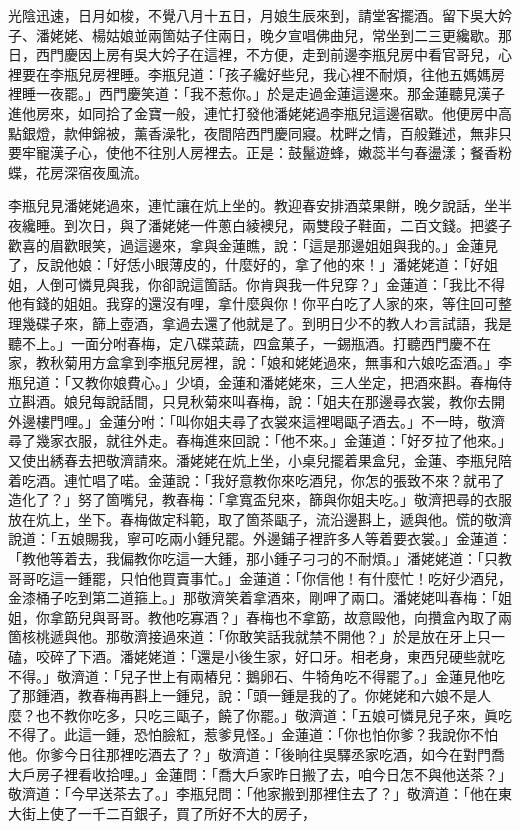 光陰迅速，日月如梭，不覺八月十五日，月娘生辰來到，請堂客擺酒。留下吳大妗子、潘姥姥、楊姑娘並兩箇姑子住兩日，晚夕宣唱佛曲兒，常坐到二三更纔歇。那日，西門慶因上房有吳大妗子在這裡，不方便，走到前邊李瓶兒房中看官哥兒，心裡要在李瓶兒房裡睡。李瓶兒道：「孩子纔好些兒，我心裡不耐煩，往他五媽媽房裡睡一夜罷。」{}西門慶笑道：「我不惹你。」於是走過金蓮這邊來。那金蓮聽見漢子進他房來，如同拾了金寶一般，連忙打發他潘姥姥過李瓶兒這邊宿歇。他便房中高點銀燈，款伸錦被，薰香澡牝，夜間陪西門慶同寢。枕畔之情，百般難述，無非只要牢寵漢子心，使他不往別人房裡去。正是：鼓鬣遊蜂，嫩蕊半勻春盪漾；餐香粉蝶，花房深宿夜風流。

李瓶兒見潘姥姥過來，連忙讓在炕上坐的。教迎春安排酒菜果餅，晚夕說話，坐半夜纔睡。到次日，與了潘姥姥一件蔥白綾襖兒，兩雙段子鞋面，二百文錢。把婆子歡喜的眉歡眼笑，過這邊來，拿與金蓮瞧，說：「這是那邊姐姐與我的。」金蓮見了，反說他娘：「好恁小眼薄皮的，什麼好的，拿了他的來！」潘姥姥道：「好姐姐，人倒可憐見與我，你卻說這箇話。你肯與我一件兒穿？」金蓮道：「我比不得他有錢的姐姐。我穿的還沒有哩，拿什麼與你！你平白吃了人家的來，等住回可整理幾碟子來，篩上壺酒，拿過去還了他就是了。到明日少不的教人わ言試語，我是聽不上。」{}一面分咐春梅，定八碟菜蔬，四盒菓子，一錫瓶酒。打聽西門慶不在家，教秋菊用方盒拿到李瓶兒房裡，說：「娘和姥姥過來，無事和六娘吃盃酒。」李瓶兒道：「又教你娘費心。」少頃，金蓮和潘姥姥來，三人坐定，把酒來斟。春梅侍立斟酒。娘兒每說話間，只見秋菊來叫春梅，說：「姐夫在那邊尋衣裳，教你去開外邊樓門哩。」金蓮分咐：「叫你姐夫尋了衣裳來這裡喝甌子酒去。」不一時，敬濟尋了幾家衣服，就往外走。春梅進來回說：「他不來。」金蓮道：「好歹拉了他來。」又使出綉春去把敬濟請來。潘姥姥在炕上坐，小桌兒擺着果盒兒，金蓮、李瓶兒陪着吃酒。連忙唱了喏。金蓮說：「我好意教你來吃酒兒，你怎的張致不來？就弔了造化了？」努了箇嘴兒，教春梅：「拿寬盃兒來，篩與你姐夫吃。」敬濟把尋的衣服放在炕上，坐下。春梅做定科範，取了箇茶甌子，流沿邊斟上，遞與他。慌的敬濟說道：「五娘賜我，寧可吃兩小鍾兒罷。外邊鋪子裡許多人等着要衣裳。」金蓮道：「教他等着去，我偏教你吃這一大鍾，那小鍾子刁刁的不耐煩。」潘姥姥道：「只教哥哥吃這一鍾罷，只怕他買賣事忙。」金蓮道：「你信他！有什麼忙！吃好少酒兒，金漆桶子吃到第二道箍上。」那敬濟笑着拿酒來，剛呷了兩口。潘姥姥叫春梅：「姐姐，你拿筯兒與哥哥。教他吃寡酒？」春梅也不拿筯，故意毆他，向攢盒內取了兩箇核桃遞與他。{}那敬濟接過來道：「你敢笑話我就禁不開他？」於是放在牙上只一磕，咬碎了下酒。潘姥姥道：「還是小後生家，好口牙。相老身，東西兒硬些就吃不得。」敬濟道：「兒子世上有兩樁兒：鵝卵石、牛犄角吃不得罷了。」金蓮見他吃了那鍾酒，教春梅再斟上一鍾兒，說：「頭一鍾是我的了。你姥姥和六娘不是人麼？也不教你吃多，只吃三甌子，饒了你罷。」敬濟道：「五娘可憐見兒子來，眞吃不得了。此這一鍾，恐怕臉紅，惹爹見怪。」金蓮道：「你也怕你爹？我說你不怕他。{}你爹今日往那裡吃酒去了？」敬濟道：「後晌往吳驛丞家吃酒，如今在對門喬大戶房子裡看收拾哩。」金蓮問：「喬大戶家昨日搬了去，咱今日怎不與他送茶？」敬濟道：「今早送茶去了。」李瓶兒問：「他家搬到那裡住去了？」敬濟道：「他在東大街上使了一千二百銀子，買了所好不大的房子，